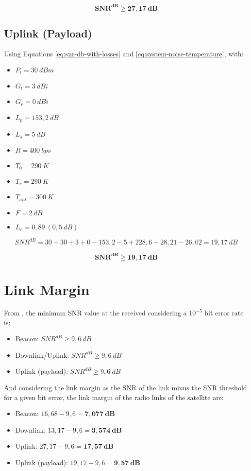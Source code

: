 \begin{equation}
    \mathbf{SNR^{dB} \geq 27,17\ dB}
\end{equation}

\subsection{Uplink (Payload)}

Using Equations \ref{eq:snr-db-with-losses} and \ref{eq:system-noise-temperature}, with:

\begin{itemize}
    \item $P_{t} = 30\ dBm$
    \item $G_{t} = 3\ dBi$
    \item $G_{r} = 0\ dBi$
    \item $L_{p} = 153,2\ dB$
    \item $L_{s} = 5\ dB$
    \item $R = 400\ bps$
    \item $T_{0} = 290\ K$
    \item $T_{r} = 290\ K$
    \item $T_{ant} = 300\ K$
    \item $F = 2\ dB$
    \item $L_{r} = 0,89\ (0,5\ dB)$
\end{itemize}

\begin{equation}
    SNR^{dB} = 30 - 30 + 3 + 0 - 153,2 - 5 + 228,6 - 28,21 - 26,02 = 19,17\ dB
\end{equation}

\begin{equation}
    \mathbf{SNR^{dB} \geq 19,17\ dB}
\end{equation}

\section{Link Margin}

From \cite{larson2005}, the minimum SNR value at the received considering a $10^{-5}$ bit error rate is:

\begin{itemize}
    \item Beacon: $SNR^{dB} \geq 9,6\ dB$
    \item Downlink/Uplink: $SNR^{dB} \geq 9,6\ dB$
    \item Uplink (payload): $SNR^{dB} \geq 9,6\ dB$
\end{itemize}

And considering the link margin as the SNR of the link minus the SNR threshold for a given bit error, the link margin of the radio links of the satellite are:

\begin{itemize}
    \item Beacon: $16,68 - 9,6 = \mathbf{7,077\ dB}$
    \item Downlink: $13,17 - 9,6 = \mathbf{3,574\ dB}$
    \item Uplink: $27,17 - 9,6 = \mathbf{17,57\ dB}$
    \item Uplink (payload): $19,17 - 9,6 = \mathbf{9,57\ dB}$
\end{itemize}
